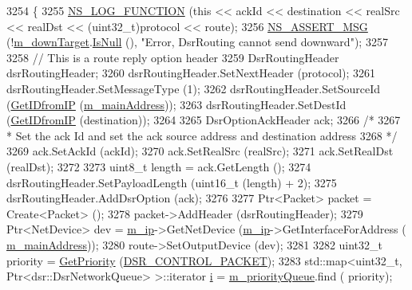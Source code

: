 \begin{DoxyCode}
3254 \{
3255   \hyperlink{log-macros-disabled_8h_a90b90d5bad1f39cb1b64923ea94c0761}{NS\_LOG\_FUNCTION} (\textcolor{keyword}{this} << ackId << destination << realSrc << realDst << (uint32\_t)protocol 
      << route);
3256   \hyperlink{assert_8h_aff5ece9066c74e681e74999856f08539}{NS\_ASSERT\_MSG} (!\hyperlink{classns3_1_1dsr_1_1DsrRouting_aa1eb6ea60fdf9ba2cac2079a74ce1ca4}{m\_downTarget}.\hyperlink{classns3_1_1Callback_aa8e27826badbf37f84763f36f70d9b54}{IsNull} (), \textcolor{stringliteral}{"Error, DsrRouting cannot send
       downward"});
3257 
3258   \textcolor{comment}{// This is a route reply option header}
3259   DsrRoutingHeader dsrRoutingHeader;
3260   dsrRoutingHeader.SetNextHeader (protocol);
3261   dsrRoutingHeader.SetMessageType (1);
3262   dsrRoutingHeader.SetSourceId (\hyperlink{classns3_1_1dsr_1_1DsrRouting_a4593e50d5f36e9b9b013fe0422067c44}{GetIDfromIP} (\hyperlink{classns3_1_1dsr_1_1DsrRouting_a73182b5edee2d8460f28855e058fc9a0}{m\_mainAddress}));
3263   dsrRoutingHeader.SetDestId (\hyperlink{classns3_1_1dsr_1_1DsrRouting_a4593e50d5f36e9b9b013fe0422067c44}{GetIDfromIP} (destination));
3264 
3265   DsrOptionAckHeader ack;
3266   \textcolor{comment}{/*}
3267 \textcolor{comment}{   * Set the ack Id and set the ack source address and destination address}
3268 \textcolor{comment}{   */}
3269   ack.SetAckId (ackId);
3270   ack.SetRealSrc (realSrc);
3271   ack.SetRealDst (realDst);
3272 
3273   uint8\_t length = ack.GetLength ();
3274   dsrRoutingHeader.SetPayloadLength (uint16\_t (length) + 2);
3275   dsrRoutingHeader.AddDsrOption (ack);
3276 
3277   Ptr<Packet> packet = Create<Packet> ();
3278   packet->AddHeader (dsrRoutingHeader);
3279   Ptr<NetDevice> dev = \hyperlink{classns3_1_1dsr_1_1DsrRouting_a0443d48172143cafa1d0491e35f3fbaf}{m\_ip}->GetNetDevice (\hyperlink{classns3_1_1dsr_1_1DsrRouting_a0443d48172143cafa1d0491e35f3fbaf}{m\_ip}->GetInterfaceForAddress (
      \hyperlink{classns3_1_1dsr_1_1DsrRouting_a73182b5edee2d8460f28855e058fc9a0}{m\_mainAddress}));
3280   route->SetOutputDevice (dev);
3281 
3282   uint32\_t priority = \hyperlink{classns3_1_1dsr_1_1DsrRouting_a67d111b0188b6e2210d1b4782820f8e3}{GetPriority} (\hyperlink{namespacens3_1_1dsr_a7c80bcec67d78dc149a0e503014d07c5abeaa53bf31d961c221e4e377ef6022f2}{DSR\_CONTROL\_PACKET});
3283   std::map<uint32\_t, Ptr<dsr::DsrNetworkQueue> >::iterator \hyperlink{bernuolliDistribution_8m_a6f6ccfcf58b31cb6412107d9d5281426}{i} = \hyperlink{classns3_1_1dsr_1_1DsrRouting_a4606c3dfb1099afbfe1e7cd1d1c3c8ee}{m\_priorityQueue}.find (
      priority);

\end{DoxyCode}

